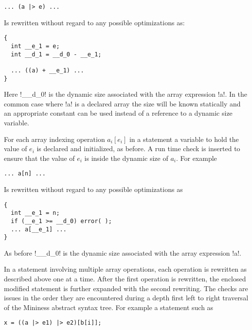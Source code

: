 \singlespace
\begin{lstlisting}[language=nesC]
... (a |> e) ...
\end{lstlisting}
\primaryspacing

Is rewritten without regard to any possible optimizations as:

\singlespace
\begin{lstlisting}[language=nesC]
{
  int __e_1 = e;
  int __d_1 = __d_0 - __e_1;

  ... ((a) + __e_1) ...
}
\end{lstlisting}
\primaryspacing

Here !__d_0! is the dynamic size associated with the array expression !a!. In the common case
where !a! is a declared array the size will be known statically and an appropriate constant can
be used instead of a reference to a dynamic size variable.

For each array indexing operation $a_i[e_i]$ in a statement a variable to hold the value of
$e_i$ is declared and initialized, as before. A run time check is inserted to ensure that
the value of $e_i$ is inside the dynamic size of $a_i$. For example

\singlespace
\begin{lstlisting}[language=nesC]
... a[n] ...
\end{lstlisting}
\primaryspacing

Is rewritten without regard to any possible optimizations as

\singlespace
\begin{lstlisting}[language=nesC]
{
  int __e_1 = n;
  if (__e_1 >= __d_0) error( );
  ... a[__e_1] ...
}
\end{lstlisting}
\primaryspacing

As before !__d_0! is the dynamic size associated with the array expression !a!.

In a statement involving multiple array operations, each operation is rewritten as described
above one at a time. After the first operation is rewritten, the enclosed modified statement is
further expanded with the second rewriting. The checks are issues in the order they are
encountered during a depth first left to right traversal of the Mininess abstract syntax tree.
For example a statement such as

\singlespace
\begin{lstlisting}[language=nesC]
x = ((a |> e1) |> e2)[b[i]];
\end{lstlisting}
\primaryspacing

